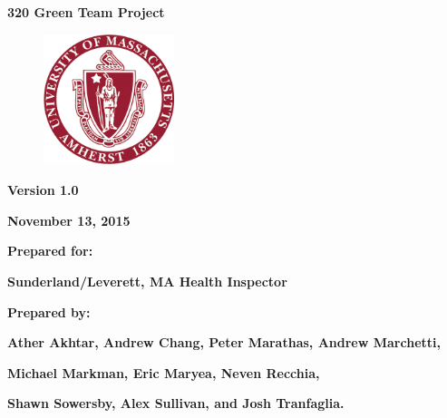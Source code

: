 \documentclass[twoside,letterpaper]{article}
\begin{document}
\clearpage\setcounter{page}{1}\pagestyle{Standard}
\thispagestyle{FirstPage}


\bigskip

{\centering{}\bfseries\color{black}
320 Green Team Project
\par}


\bigskip


\begin{figure}
\centering
\includegraphics[width=1.5in,height=1.5in]{Uma_seal.png}
\end{figure}

\bigskip


\bigskip

{\centering{}\bfseries\color{black}
Version 1.0
\par}

{\centering{}\bfseries\color{black}
November 13, 2015
\par}


\bigskip


\bigskip

{\centering{}\bfseries\color{black}
Prepared for:
\par}

{\centering{}\bfseries\color{black}
Sunderland/Leverett, MA Health Inspector
\par}


\bigskip


\bigskip

{\centering{}\bfseries\color{black}
Prepared by:
\par}

{\centering{}\bfseries\color{black}
Ather Akhtar, Andrew Chang, Peter Marathas, Andrew Marchetti, \par}
{\centering{}\bfseries\color{black}
 Michael Markman, Eric Maryea, Neven Recchia,
\par}
{\centering{}\bfseries\color{black}
Shawn Sowersby, Alex Sullivan, and Josh Tranfaglia.\par}
\end{document}
